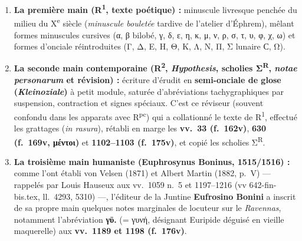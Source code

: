 \documentclass[10pt, a4paper, twoside]{book}
\renewcommand{\_}{\origunderscore\penalty0\relax}
\renewcommand{\texttt}[1]{#1}
\providecommand{\italique}[1]{\emph{#1}}
\providecommand{\lecon}[1]{\textbf{#1}}
\providecommand{\expo}[1]{\textsuperscript{#1}}
\providecommand{\ieme}{\textsuperscript{e}}
\providecommand{\Run}{R\expo{1}}
\providecommand{\Rpc}{R\expo{pc}}
\providecommand{\Rdeux}{R\expo{2}}
\begin{document}
\begin{enumerate}
  \item \textbf{La première main (\Run{}, texte poétique) :} minuscule livresque penchée du milieu du X\ieme{} siècle (\italique{minuscule bouletée} tardive de l'atelier d'Éphrem), mêlant formes minuscules cursives (α, β bilobé, γ, δ, ε, η, κ, μ, ν, ρ, σ, τ, υ, φ, χ, ω) et formes d'onciale réintroduites (Γ, Δ, Ε, Η, Θ, Κ, Λ, Ν, Π, Σ lunaire Ϲ, Ω).
  \item \textbf{La seconde main contemporaine (\Rdeux{}, \italique{Hypothesis}, scholies Σ\textsuperscript{R}, \italique{notae personarum} et révision) :} écriture d'érudit en \textbf{semi-onciale de glose (\italique{Kleinoziale})} à petit module, saturée d'abréviations tachygraphiques par suspension, contraction et signes spéciaux. C'est ce réviseur (souvent confondu dans les apparats avec \Rpc{}) qui a collationné le texte de \Run{}, effectué les grattages (\italique{in rasura}), rétabli en marge les \textbf{vv.~33 (\texttt{f.~162v})}, \textbf{630 (\texttt{f.~169v}, μέντοι)} et \textbf{1102--1103 (\texttt{f.~175v})}, et copié les scholies Σ\textsuperscript{R}.
  \item \textbf{La troisième main humaniste (Euphrosynus Boninus, 1515/1516) :} comme l'ont établi von Velsen (1871) et Albert Martin (1882, p.~V) --- rappelés par Louis Hauseux aux vv.~1059 n.~5 et 1197--1216 (\texttt{vv 642-fin-bis.tex}, ll.~4293, 5310) ---, l'éditeur de la Juntine \textbf{Eufrosino Bonini} a inscrit de sa propre main quelques notes marginales de locuteur sur le \italique{Ravennas}, notamment l'abréviation \lecon{γϋ.} (= γυνή, désignant Euripide déguisé en vieille maquerelle) aux \textbf{vv.~1189 et 1198 (\texttt{f.~176v})}.
\end{enumerate}
\end{document}
